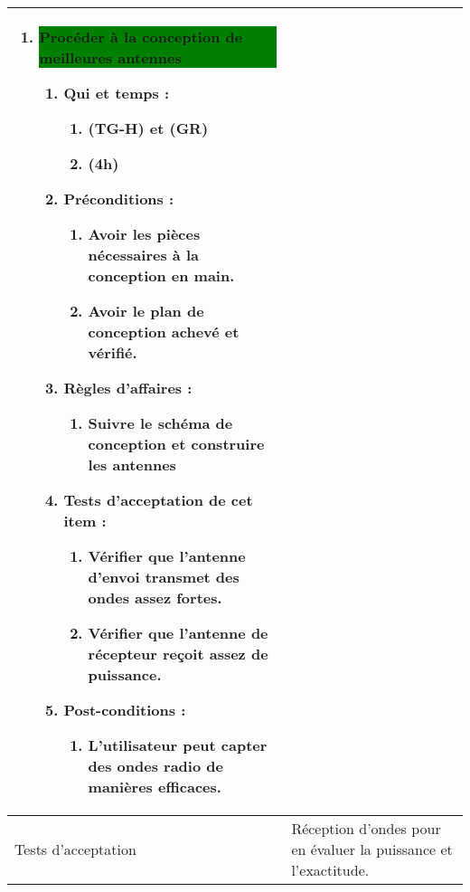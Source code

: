 \begin{longtable}{|l|p{}|}
\begin{enumerate}[label*=\arabic*.]
\begin{enumerate}[label*=\arabic*.]
\begin{enumerate}[label*=\arabic*.]
                    \end{enumerate}
                \end{enumerate}
            \item  \colorbox{Green}{\parbox{13cm}{ Procéder à la conception de meilleures antennes}}
                \begin{enumerate}[label*=\arabic*.]
                    \item Qui et temps :
                    \begin{enumerate}[label*=\arabic*.]
                        \item (TG-H) et (GR)
                        \item (4h)
                    \end{enumerate}
                    \item Préconditions : 
                    \begin{enumerate}[label*=\arabic*.]
                        \item Avoir les pièces nécessaires à la conception en main.
                        \item Avoir le plan de conception achevé et vérifié.
                    \end{enumerate}
                    \item Règles d’affaires :
                    \begin{enumerate}[label*=\arabic*.]
                        \item Suivre le schéma de conception et construire les antennes
                    \end{enumerate}
                    \item Tests d'acceptation de cet item :
                    \begin{enumerate}[label*=\arabic*.]
                        \item Vérifier que l'antenne d'envoi transmet des ondes assez fortes.
                        \item Vérifier que l'antenne de récepteur reçoit assez de puissance.
                    \end{enumerate}
                    \item Post-conditions :
                    \begin{enumerate}[label*=\arabic*.]
                        \item L'utilisateur peut capter des ondes radio de manières efficaces.
                    \end{enumerate}
                \end{enumerate}
        \end{enumerate} \\
\hline
    Tests d'acceptation & Réception d'ondes pour en évaluer la puissance et l'exactitude.\\


\end{longtable}
